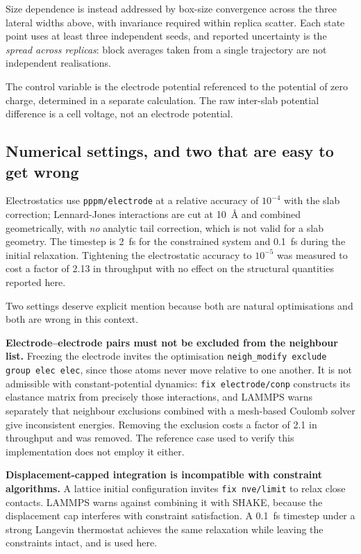\documentclass[11pt,a4paper]{article}
\begin{document}
Size dependence is instead addressed by box-size convergence across the three lateral widths above,
with invariance required within replica scatter. Each state point uses at least three independent
seeds, and reported uncertainty is the \emph{spread across replicas}: block averages taken from a
single trajectory are not independent realisations.

The control variable is the electrode potential referenced to the potential of zero charge,
determined in a separate calculation. The raw inter-slab potential difference is a cell voltage, not
an electrode potential.

\subsection{Numerical settings, and two that are easy to get wrong}\label{sec:numerics}

Electrostatics use \texttt{pppm/electrode} at a relative accuracy of $10^{-4}$ with the slab
correction; Lennard-Jones interactions are cut at \SI{10}{\angstrom} and combined geometrically, with
\emph{no} analytic tail correction, which is not valid for a slab geometry. The timestep is
\SI{2}{\femto\second} for the constrained system and \SI{0.1}{\femto\second} during the initial
relaxation. Tightening the electrostatic accuracy to $10^{-5}$ was measured to cost a factor of
2.13 in throughput with no effect on the structural quantities reported here.

Two settings deserve explicit mention because both are natural optimisations and both are wrong in
this context.

\textbf{Electrode--electrode pairs must not be excluded from the neighbour list.} Freezing the
electrode invites the optimisation \texttt{neigh\_modify exclude group elec elec}, since those atoms
never move relative to one another. It is not admissible with constant-potential dynamics:
\texttt{fix electrode/conp} constructs its elastance matrix from precisely those interactions, and
LAMMPS warns separately that neighbour exclusions combined with a mesh-based Coulomb solver give
inconsistent energies. Removing the exclusion costs a factor of 2.1 in throughput and was removed.
The reference case used to verify this implementation does not employ it either.

\textbf{Displacement-capped integration is incompatible with constraint algorithms.} A lattice
initial configuration invites \texttt{fix nve/limit} to relax close contacts. LAMMPS warns against
combining it with SHAKE, because the displacement cap interferes with constraint satisfaction. A
\SI{0.1}{\femto\second} timestep under a strong Langevin thermostat achieves the same relaxation
while leaving the constraints intact, and is used here.
\end{document}
